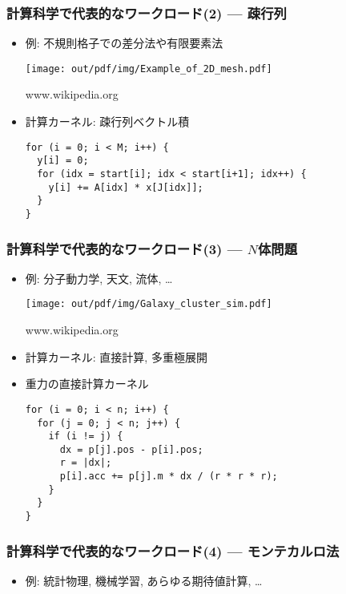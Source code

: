\documentclass[10pt,dvipdfmx]{beamer}
\begin{document}
\begin{frame}[fragile]
\frametitle{計算科学で代表的なワークロード(2) --- 疎行列}

\begin{itemize}
\item 例: 不規則格子での差分法や有限要素法

  \begin{center}
  \texttt{[image: out/pdf/img/Example\_of\_2D\_mesh.pdf]}

  {\tiny www.wikipedia.org}
  \end{center}
  
\item 計算カーネル: 疎行列ベクトル積
\begin{lstlisting}
for (i = 0; i < M; i++) {
  y[i] = 0;
  for (idx = start[i]; idx < start[i+1]; idx++) {
    y[i] += A[idx] * x[J[idx]];
  }
}
\end{lstlisting}


\end{itemize}
\end{frame}

\begin{frame}[fragile]
\frametitle{計算科学で代表的なワークロード(3) --- $N$体問題}

\begin{itemize}
\item 例: 分子動力学, 天文, 流体, \ldots
  \begin{center}
  \texttt{[image: out/pdf/img/Galaxy\_cluster\_sim.pdf]}

  {\tiny www.wikipedia.org}
\end{center}

\item 計算カーネル: 直接計算, 多重極展開

\item 重力の直接計算カーネル
\begin{lstlisting}
for (i = 0; i < n; i++) {
  for (j = 0; j < n; j++) {
    if (i != j) {
      dx = p[j].pos - p[i].pos;
      r = |dx|;
      p[i].acc += p[j].m * dx / (r * r * r);
    }
  }
}
\end{lstlisting}
\end{itemize}
\end{frame}

\begin{frame}
\frametitle{計算科学で代表的なワークロード(4) --- モンテカルロ法}

\begin{itemize}
\item 例: 統計物理, 機械学習, あらゆる期待値計算, \ldots

  
\end{itemize}
\end{frame}
\end{document}
